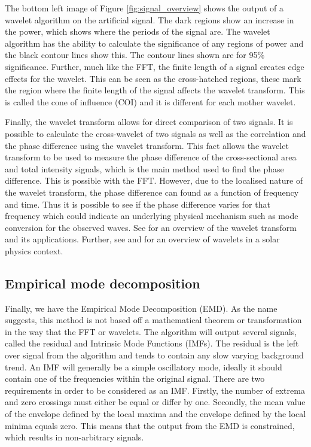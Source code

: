     The bottom left image of Figure \ref{fig:signal_overview} shows the output of a wavelet algorithm on the artificial signal.
    The dark regions show an increase in the power, which shows where the periods of the signal are.
    The wavelet algorithm has the ability to calculate the significance of any regions of power and the black contour lines show this.
    The contour lines shown are for 95\% significance. 
    Further, much like the FFT, the finite length of a signal creates edge effects for the wavelet.
    This can be seen as the cross-hatched regions, these mark the region where the finite length of the signal affects the wavelet transform.
    This is called the cone of influence (COI) and it is different for each mother wavelet.
    
    Finally, the wavelet transform allows for direct comparison of two signals.
    It is possible to calculate the cross-wavelet of two signals as well as the correlation and the phase difference using the wavelet transform.
    This fact allows the wavelet transform to be used to measure the phase difference of the cross-sectional area and total intensity signals, which is the main method used to find the phase difference.
    This is possible with the FFT. 
    However, due to the localised nature of the wavelet transform, the phase difference can found as  a function of frequency and time.
    Thus it is possible to see if the phase difference varies for that frequency which could indicate an underlying physical mechanism such as mode conversion for the observed waves.
    See \cite{torrence} for an overview of the wavelet transform and its applications.
    Further, see \cite{2004SoPh..222..203D} and \cite{WAUO} for an overview of wavelets in a solar physics context.
    
\subsection{Empirical mode decomposition}

	Finally, we have the Empirical Mode Decomposition (EMD).
	As the name suggests, this method is not based off a mathematical theorem or transformation in the way that the FFT or wavelets.
    The algorithm will output several signals, called the residual and Intrinsic Mode Functions (IMFs).
    The residual is the left over signal from the algorithm and tends to contain any slow varying background trend.
    An IMF will generally be a simple oscillatory mode, ideally it should contain one of the frequencies within the original signal.
    There are two requirements in order to be considered as an IMF.
    Firstly, the number of extrema and zero crossings must either be equal or differ by one.
    Secondly, the mean value of the envelope defined by the local maxima and the envelope defined by the local minima equals zero.
    This means that the output from the EMD is constrained, which results in non-arbitrary signals.
    
